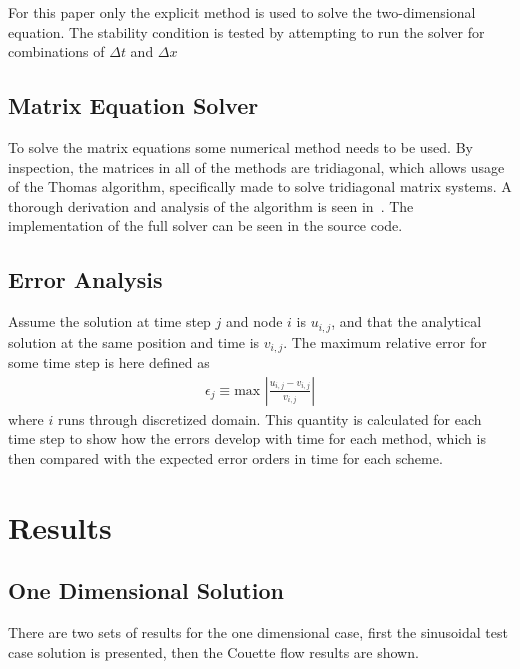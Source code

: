 \documentclass[aps,reprint]{revtex4-1}
\begin{document}
For this paper only the explicit method is used to solve the two-dimensional equation.
The stability condition is tested by attempting to run the solver for combinations
of $\Delta t$ and $\Delta x$
\subsection{Matrix Equation Solver}
To solve the matrix equations some numerical method needs to be used. By inspection,
the matrices in all of the methods are tridiagonal, which allows usage of the
Thomas algorithm, specifically made to solve tridiagonal matrix systems. A
thorough derivation and analysis of the algorithm is seen in~\cite{project1}. The
implementation of the full solver can be seen in the source code.
\subsection{Error Analysis}
Assume the solution at time step $j$ and node $i$ is $u_{i,j}$, and that the analytical
solution at the same position and time is $v_{i,j}$. The maximum relative error for some
time step is here defined as
\begin{align*}
  \epsilon_j \equiv \text{max }\left| \frac{u_{i,j} - v_{i,j}}{v_{i,j}}\right|
\end{align*}
where $i$ runs through discretized domain. This quantity is calculated for each
time step to show how the errors develop with time for each method, which is
then compared with the expected error orders in time for each scheme.
\section{Results} \label{sec:results}
\subsection{One Dimensional Solution}
There are two sets of results for the one dimensional case, first the sinusoidal
test case solution is presented, then the Couette flow results are shown.
\end{document}
